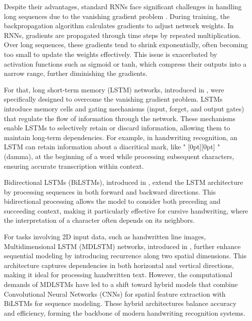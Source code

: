 \documentclass[conference]{IEEEtran}
\newcommand{\artext}[1]{%
  {\fontsize{8pt}{11pt}\selectfont \raisebox{0pt}[0pt][0pt]{\RL{#1}}}%
}
\begin{document}
Despite their advantages, standard RNNs face significant challenges in handling long sequences due to the vanishing gradient problem \cite{bengio1994learning}. During training, the backpropagation algorithm calculates gradients to adjust network weights. In RNNs, gradients are propagated through time steps by repeated multiplication. Over long sequences, these gradients tend to shrink exponentially, often becoming too small to update the weights effectively. This issue is exacerbated by activation functions such as sigmoid or tanh, which compress their outputs into a narrow range, further diminishing the gradients.

For that, long short-term memory (LSTM) networks, introduced in \cite{hochreiter1997long}, were specifically designed to overcome the vanishing gradient problem. LSTMs introduce memory cells and gating mechanisms (input, forget, and output gates) that regulate the flow of information through the network. These mechanisms enable LSTMs to selectively retain or discard information, allowing them to maintain long-term dependencies. For example, in handwriting recognition, an LSTM can retain information about a diacritical mark, like "\artext{ضمّة}" (damma), at the beginning of a word while processing subsequent characters, ensuring accurate transcription within context.

Bidirectional LSTMs (BiLSTMs), introduced in \cite{schuster1997bidirectional}, extend the LSTM architecture by processing sequences in both forward and backward directions. This bidirectional processing allows the model to consider both preceding and succeeding context, making it particularly effective for cursive handwriting, where the interpretation of a character often depends on its neighbors.

For tasks involving 2D input data, such as handwritten line images, Multidimensional LSTM (MDLSTM) networks, introduced in \cite{graves2007multi}, further enhance sequential modeling by introducing recurrence along two spatial dimensions. This architecture captures dependencies in both horizontal and vertical directions, making it ideal for processing handwritten text. However, the computational demands of MDLSTMs have led to a shift toward hybrid models that combine Convolutional Neural Networks (CNNs) for spatial feature extraction with BiLSTMs for sequence modeling. These hybrid architectures balance accuracy and efficiency, forming the backbone of modern handwriting recognition systems.
\end{document}
